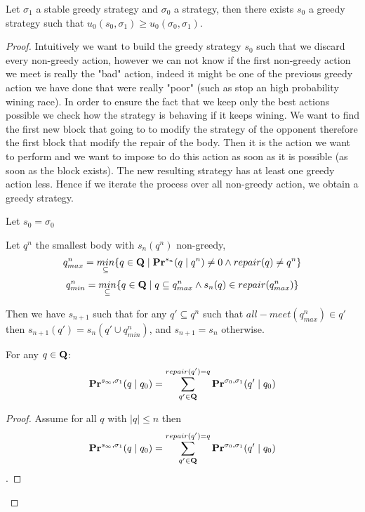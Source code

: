 \begin{myprop}
	Let $\sigma_1$ a stable greedy strategy and $\sigma_0$ a strategy, then there exists $s_0$ a greedy strategy such that $u_0(s_0,\sigma_1) \geq u_0(\sigma_0,\sigma_1)$.
\end{myprop}

\begin{proof}
	
	Intuitively we want to build the greedy strategy $s_0$ such that we discard every non-greedy action, however we can not know if the first non-greedy action we meet is really the "bad" action, indeed it might be one of the previous greedy action we have done that were really "poor" (such as stop an high probability wining race). In order to ensure the fact that we keep only the best actions possible we check how the strategy is behaving if it keeps wining. We want to find the first new block that going to to modify the strategy of the opponent therefore the first block that modify the repair of the body. Then it is the action we want to perform and we want to impose to do this action as soon as it is possible (as soon as the block exists). The new resulting strategy has at least one greedy action less. Hence if we iterate the process over all non-greedy action, we obtain a greedy strategy. 
	
	Let $s_0 = \sigma_0$
	
	Let $q^n$  the smallest body with $s_n(q^n)$ non-greedy, 
	$$q^n_{max} = \underset{\subseteq}{min}\{q \in \mathbf{Q} \mid  \mathbf{Pr}^{s_n}(q\mid q^n)\neq 0 \land repair(q) \neq q^n \}$$
	$$q^n_{min} = \underset{\subseteq}{min}\{q \in \mathbf{Q} \mid  q \subseteq q^n_{max} \land s_n(q) \in repair(q^n_{max}) \}$$
	
	
	Then we have $s_{n+1}$ such that for any $q' \subseteq q^n$ such that $all-meet(q^n_{max}) \in q'$ then $s_{n+1}(q') = s_n(q' \cup q^n_{min})$, and $s_{n+1} = s_n$ otherwise.
	
	\begin{mylem}
		\label{lemmpr}
		For any $q \in \mathbf{Q}$: 
		$$\mathbf{Pr}^{s_{\infty},\sigma_1}(q \mid q_0)  = \sum_{q'\in \mathbf{Q}}^{repair(q') = q} \mathbf{Pr}^{\sigma_0,\sigma_1}(q' \mid q_0)$$
	\end{mylem}
	\begin{proof}
		
		Assume for all $q$ with $|q| \leq n$ then $$\mathbf{Pr}^{s_{\infty},\sigma_1}(q \mid q_0)  = \sum_{q'\in \mathbf{Q}}^{repair(q') = q} \mathbf{Pr}^{\sigma_0,\sigma_1}(q' \mid q_0)$$. 
		

\end{proof}
\end{proof}
